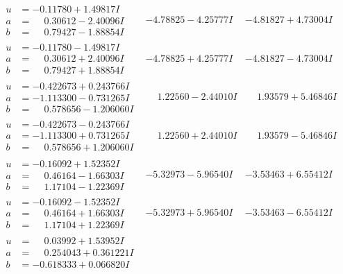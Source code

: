 \documentclass[1p]{elsarticle_modified}
\theoremstyle{definition}
\begin{document}
$$\begin{array}{c|c|c}
\begin{aligned}
u &= -0.11780 + 1.49817 I \\
a &= \phantom{-}0.30612 - 2.40096 I \\
b &= \phantom{-}0.79427 - 1.88854 I\end{aligned}
 & -4.78825 - 4.25777 I & -4.81827 + 4.73004 I \\ \hline\begin{aligned}
u &= -0.11780 - 1.49817 I \\
a &= \phantom{-}0.30612 + 2.40096 I \\
b &= \phantom{-}0.79427 + 1.88854 I\end{aligned}
 & -4.78825 + 4.25777 I & -4.81827 - 4.73004 I \\ \hline\begin{aligned}
u &= -0.422673 + 0.243766 I \\
a &= -1.113300 - 0.731265 I \\
b &= \phantom{-}0.578656 - 1.206060 I\end{aligned}
 & \phantom{-}1.22560 - 2.44010 I & \phantom{-}1.93579 + 5.46846 I \\ \hline\begin{aligned}
u &= -0.422673 - 0.243766 I \\
a &= -1.113300 + 0.731265 I \\
b &= \phantom{-}0.578656 + 1.206060 I\end{aligned}
 & \phantom{-}1.22560 + 2.44010 I & \phantom{-}1.93579 - 5.46846 I \\ \hline\begin{aligned}
u &= -0.16092 + 1.52352 I \\
a &= \phantom{-}0.46164 - 1.66303 I \\
b &= \phantom{-}1.17104 - 1.22369 I\end{aligned}
 & -5.32973 - 5.96540 I & -3.53463 + 6.55412 I \\ \hline\begin{aligned}
u &= -0.16092 - 1.52352 I \\
a &= \phantom{-}0.46164 + 1.66303 I \\
b &= \phantom{-}1.17104 + 1.22369 I\end{aligned}
 & -5.32973 + 5.96540 I & -3.53463 - 6.55412 I \\ \hline\begin{aligned}
u &= \phantom{-}0.03992 + 1.53952 I \\
a &= \phantom{-}0.254043 + 0.361221 I \\
b &= -0.618333 + 0.066820 I\end{aligned}

\end{array}$$
\end{document}
